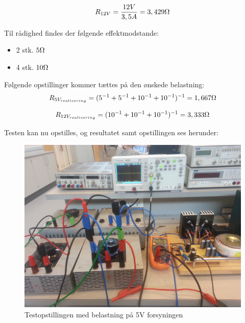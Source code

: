 \begin{equation}
	R_{12V} = \frac{12V}{3,5A} = 3,429\ohm
\end{equation}

Til rådighed findes der følgende effektmodstande:
\begin{itemize}
\item 2 stk. $5\ohm$
\item 4 stk. $10\ohm$
\end{itemize}

Følgende opstillinger kommer tættes på den ønskede belastning:
\begin{equation}
	R_{5V_{realisering}} = (5^{-1} + 5^{-1} + 10^{-1} + 10^{-1})^{-1} = 1,667\ohm
\end{equation}

\begin{equation}
	R_{12V_{realisering}} = (10^{-1} + 10^{-1} + 10^{-1})^{-1} = 3,333\ohm
\end{equation}

Testen kan nu opstilles, og resultatet samt opstillingen ses herunder:
\begin{figure}[H]
	\centering
	\includegraphics[scale=0.1]{../Hardware/PSU/Realisering/5VloadOpstilling}
	\caption{Testopstillingen med belastning på 5V forsyningen}
	\label{photo:5VloadOpstilling}
\end{figure}

